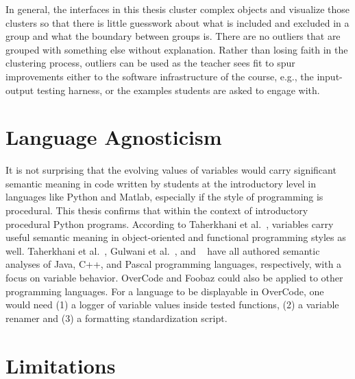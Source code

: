 
In general, the interfaces in this thesis cluster complex objects and visualize those clusters so that there is little guesswork about what is included and excluded in a group and what the boundary between groups is. There are no outliers that are grouped with something else without explanation. Rather than losing faith in the clustering process, outliers can be used as the teacher sees fit to spur improvements either to the software infrastructure of the course, e.g., the input-output testing harness, or the examples students are asked to engage with. 

\section{Language Agnosticism}

It is not surprising that the evolving values of variables would carry significant semantic meaning in code written by students at the introductory level in languages like Python and Matlab, especially if the style of programming is procedural. This thesis confirms that within the context of introductory procedural Python programs. According to Taherkhani et al.~\cite{taherkhani2010recognizing}, variables carry useful semantic meaning in object-oriented and functional programming styles as well. Taherkhani et al.~\cite{}, Gulwani et al.~\cite{gulwani_fse14}, and ~\cite{sajaniemi2002empirical} have all authored semantic analyses of Java, C++, and Pascal programming languages, respectively, with a focus on variable behavior. OverCode and Foobaz could also be applied to other programming languages. For a language to be displayable in OverCode, one would need (1) a logger of variable values inside tested functions, (2) a variable renamer and (3) a formatting standardization script.



\section{Limitations}

